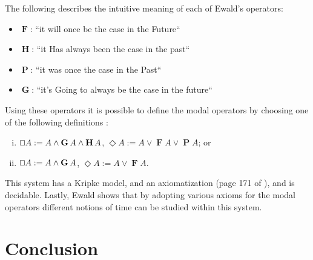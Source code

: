 \documentclass{article}
\renewcommand{\Box}{\oblong}
\newcommand{\F}{\mathop{\textbf{F}}}
\renewcommand{\P}{\mathop{\textbf{P}}}
\newcommand{\G}{\mathop{\textbf{G}}}
\renewcommand{\H}{\mathop{\textbf{H}}}
\begin{document}
The following describes the intuitive meaning of each of Ewald's
operators:
\begin{itemize}
\item[] $\F$: ``it will once be the case in the Future``  
\item[] $\H$: ``it Has always been the case in the past``
\item[] $\P$: ``it was once the case in the Past``
\item[] $\G$: ``it's Going to  always be the case in the future``  
\end{itemize}


Using these operators it is possible to define the  modal
operators by choosing one of the following definitions
\cite{ewald1986}:
\begin{enumerate}[i.]
\item $\Box A := A \land \G A \land \H A$, $\Diamond A := A \lor \F A \lor \P A$; or
\item $\Box A := A \land \G A$, $\Diamond A := A \lor \F A$.
\end{enumerate}

This system has a Kripke model, and an axiomatization (page 171 of
\cite{ewald1986}), and is decidable.  Lastly, Ewald shows that by
adopting various axioms for the modal operators different notions of
time can be studied within this system.

\section{Conclusion}



\end{document}
